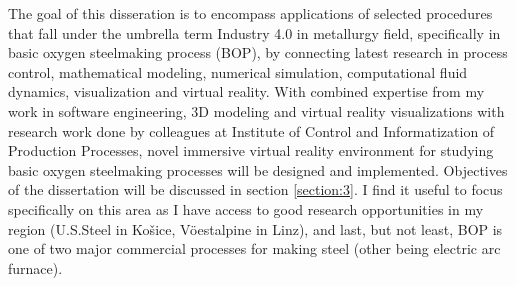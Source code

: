 The goal of this disseration is to encompass applications of selected procedures that fall under the umbrella term Industry 4.0 in metallurgy field, specifically in basic oxygen steelmaking process (BOP), by connecting latest research in process control, mathematical modeling, numerical simulation, computational fluid dynamics, visualization and virtual reality. With combined expertise from my work in software engineering, 3D modeling and virtual reality visualizations with research work done by colleagues at Institute of Control and Informatization of Production Processes, novel immersive virtual reality environment for studying basic oxygen steelmaking processes will be designed and implemented. Objectives of the dissertation will be discussed in section \ref{section:3}. I find it useful to focus specifically on this area as I have access to good research opportunities in my region (U.S.Steel in Košice, V\"{o}estalpine in Linz), and last, but not least, BOP is one of two major commercial processes for making steel (other being electric arc furnace).